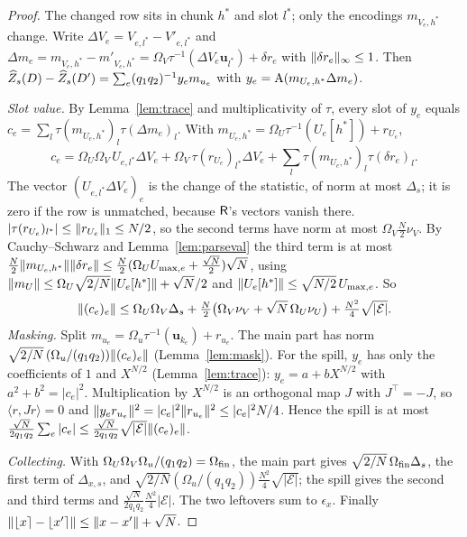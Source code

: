 \begin{proof}
The changed row sits in chunk $h^*$ and slot $l^*$; only the encodings $m_{V_e,h^*}$ change. Write $\Delta V_e=V_{e,l^*}-V'_{e,l^*}$ and $\Delta m_e=m_{V_e,h^*}-m'_{V_e,h^*}=\Omega_V\tau^{-1}(\Delta V_e\mathbf u_{l^*})+\delta r_e$ with $\lVert \delta r_e\rVert_\infty\le1$. Then $\widehat Z_s(D)-\widehat Z_s(D')=\sum_e(q_1q_2)^{-1}y_em_{u_e}$ with $y_e=\mathrm{A}(m_{U_e,h^*}\Delta m_e)$.

\emph{Slot value.} By Lemma~\ref{lem:trace} and multiplicativity of $\tau$, every slot of $y_e$ equals $c_e=\sum_l\tau(m_{U_e,h^*})_l\tau(\Delta m_e)_l$. With $m_{U_e,h^*}=\Omega_U\tau^{-1}(U_e[h^*])+r_{U_e}$,
\[
  c_e=\Omega_U\Omega_V\,U_{e,l^*}\Delta V_e+\Omega_V\,\tau(r_{U_e})_{l^*}\Delta V_e+\sum_l\tau(m_{U_e,h^*})_l\tau(\delta r_e)_l .
\]
The vector $(U_{e,l^*}\Delta V_e)_e$ is the change of the statistic, of norm at most $\Delta_s$; it is zero if the row is unmatched, because $\mathsf{R}$'s vectors vanish there. $|\tau(r_{U_e})_{l^*}|\le\lVert r_{U_e}\rVert_1\le N/2$, so the second terms have norm at most $\Omega_V\tfrac N2\nu_V$. By Cauchy--Schwarz and Lemma~\ref{lem:parseval} the third term is at most $\tfrac N2\lVert m_{U_e,h^*}\rVert\lVert \delta r_e\rVert\le\tfrac N2(\Omega_UU_{\max,e}+\tfrac{\sqrt N}2)\sqrt N$, using $\lVert m_U\rVert\le\Omega_U\sqrt{2/N}\lVert U_e[h^*]\rVert+\sqrt N/2$ and $\lVert U_e[h^*]\rVert\le\sqrt{N/2}\,U_{\max,e}$. So
\[
  \lVert (c_e)_e\rVert\le\Omega_U\Omega_V\Delta_s+\tfrac N2\bigl(\Omega_V\nu_V+\sqrt N\,\Omega_U\nu_U\bigr)+\tfrac{N^2}4\sqrt{|\mathcal E|}.
\]
\emph{Masking.} Split $m_{u_e}=\Omega_u\tau^{-1}(\mathbf u_{k_e})+r_{u_e}$. The main part has norm $\sqrt{2/N}\,(\Omega_u/(q_1q_2))\lVert (c_e)_e\rVert$ (Lemma~\ref{lem:mask}). For the spill, $y_e$ has only the coefficients of $1$ and $X^{N/2}$ (Lemma~\ref{lem:trace}): $y_e=a+bX^{N/2}$ with $a^2+b^2=|c_e|^2$. Multiplication by $X^{N/2}$ is an orthogonal map $J$ with $J^\top=-J$, so $\langle r,Jr\rangle=0$ and $\lVert y_er_{u_e}\rVert^2=|c_e|^2\lVert r_{u_e}\rVert^2\le|c_e|^2N/4$. Hence the spill is at most $\tfrac{\sqrt N}{2q_1q_2}\sum_e|c_e|\le\tfrac{\sqrt N}{2q_1q_2}\sqrt{|\mathcal E|}\lVert (c_e)_e\rVert$.

\emph{Collecting.} With $\Omega_U\Omega_V\Omega_u/(q_1q_2)=\Omega_{\mathrm{fin}}$, the main part gives $\sqrt{2/N}\,\Omega_{\mathrm{fin}}\Delta_s$, the first term of $\Delta_{x,s}$, and $\sqrt{2/N}(\Omega_u/(q_1q_2))\tfrac{N^2}4\sqrt{|\mathcal E|}$; the spill gives the second and third terms and $\tfrac{\sqrt N}{2q_1q_2}\tfrac{N^2}4|\mathcal E|$. The two leftovers sum to $\epsilon_x$. Finally $\lVert \lfloor x\rceil-\lfloor x'\rceil\rVert\le\lVert x-x'\rVert+\sqrt N$.
\end{proof}

